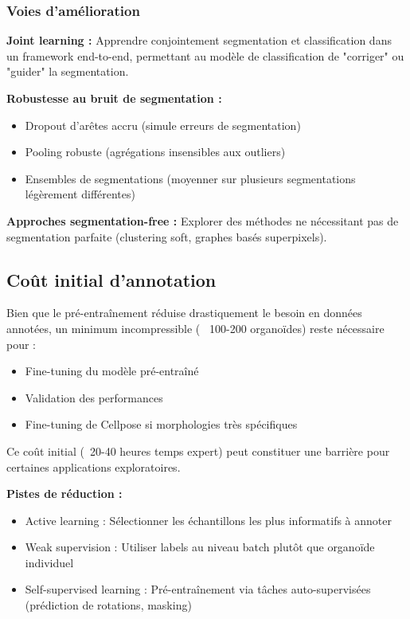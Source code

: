 \subsubsection{Voies d'amélioration}

\textbf{Joint learning :}
Apprendre conjointement segmentation et classification dans un framework end-to-end, permettant au modèle de classification de "corriger" ou "guider" la segmentation.

\textbf{Robustesse au bruit de segmentation :}
\begin{itemize}
    \item Dropout d'arêtes accru (simule erreurs de segmentation)
    \item Pooling robuste (agrégations insensibles aux outliers)
    \item Ensembles de segmentations (moyenner sur plusieurs segmentations légèrement différentes)
\end{itemize}

\textbf{Approches segmentation-free :}
Explorer des méthodes ne nécessitant pas de segmentation parfaite (clustering soft, graphes basés superpixels).

\subsection{Coût initial d'annotation}

Bien que le pré-entraînement réduise drastiquement le besoin en données annotées, un minimum incompressible (~ 100-200 organoïdes) reste nécessaire pour :
\begin{itemize}
    \item Fine-tuning du modèle pré-entraîné
    \item Validation des performances
    \item Fine-tuning de Cellpose si morphologies très spécifiques
\end{itemize}

Ce coût initial (~20-40 heures temps expert) peut constituer une barrière pour certaines applications exploratoires.

\textbf{Pistes de réduction :}
\begin{itemize}
    \item Active learning : Sélectionner les échantillons les plus informatifs à annoter
    \item Weak supervision : Utiliser labels au niveau batch plutôt que organoïde individuel
    \item Self-supervised learning : Pré-entraînement via tâches auto-supervisées (prédiction de rotations, masking)
\end{itemize}

